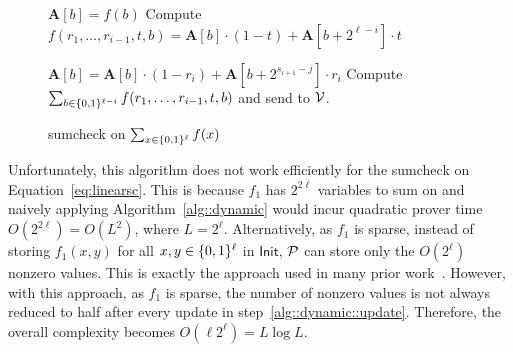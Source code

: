 \begin{figure}[b!]
    \vspace{-.5in}
	\begin{algorithm}[H]
		\caption{sumcheck on $\sum_{x\in\binary^\ell}f(x)$}\label{alg::dynamic}
		\begin{algorithmic}[1]
			\State $\textbf{A}[b] = f(b)$ 
			\EndFor
			\EndProcedure
			 
					\State\label{alg::dynamic::compute} Compute $f(r_1,\ldots, r_{i-1}, t, b) = \textbf{A}[b]\cdot(1-t)+\textbf{A}[b+2^{\ell-i}]\cdot t$
					\EndFor
					
					\State\label{alg::dynamic::update} $\textbf{A}[b]=\textbf{A}[b]\cdot(1-r_i)+\textbf{A}[b+2^{s_{i+1}-j}]\cdot r_i$
				\EndFor
					\State\label{alg::dynamic::sum} Compute $\sum_{b\in\binary^{\ell-i}}f(r_1,\ldots, r_{i-1}, t, b)$ and send to $\V$.
				\EndFor
			\EndFor
			\EndProcedure
		\end{algorithmic}
	\end{algorithm}
\end{figure}

Unfortunately, this algorithm does not work efficiently for the sumcheck on Equation~\ref{eq:linearsc}. This is because $f_1$ has $2^{2\ell}$ variables to sum on and naively applying Algorithm~\ref{alg::dynamic} would incur quadratic prover time $O(2^{2\ell}) = O(L^2)$, where $L = 2^\ell$. Alternatively, as $f_1$ is sparse, instead of storing $f_1(x,y)$ for all $x,y\in\binary^\ell$ in $\mathsf{Init}$, $\P$ can store only the $O(2^\ell)$ nonzero values. This is exactly the approach used in many prior work~\cite{CMT,wahby2017full,vram}. However, with this approach, as $f_1$ is sparse, the number of nonzero values is not always reduced to half after every update in step~\ref{alg::dynamic::update}. Therefore, the overall complexity becomes $O(\ell 2^\ell) = L\log L$.

